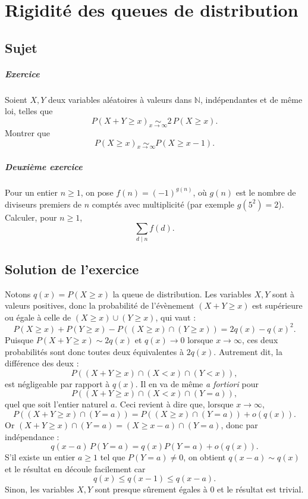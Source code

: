 \chapter{Rigidité des queues de distribution}

\section{Sujet}

\paragraph{Exercice}

Soient $X,Y$ deux variables aléatoires à valeurs dans $\mathbb N$, indépendantes et de même loi, telles que
$$
P(X+Y \geqslant x) \underset{x\to\infty}\sim 2\,P(X \geqslant x).
$$
Montrer que
$$
P(X \geqslant x) \underset{x\to\infty}\sim P(X \geqslant x-1).
$$

\paragraph{Deuxième exercice}
Pour un entier \( n \geqslant 1 \), on pose \( f(n) = (-1)^{g(n)} \), où \( g(n) \) est le nombre de diviseurs premiers de \( n \) comptés avec multiplicité (par exemple \( g(5^2) = 2 \)). Calculer, pour \( n \geqslant 1 \), 
\[ \sum_{d\mid n} f(d). \]

\section{Solution de l'exercice}

Notons $q(x) = P(X \geqslant x)$ la queue de distribution. Les variables $X,Y$ sont à valeurs positives, donc la probabilité de l'évènement $(X + Y \geqslant x)$ est supérieure ou égale à celle de $(X\geqslant x) \cup (Y \geqslant x)$, qui vaut :
\[
P(X\geqslant x) + P(Y \geqslant x) - P((X\geqslant x) \cap (Y \geqslant x)) = 2q(x) - q(x)^2.
\]
Puisque $P(X+Y \geqslant x) \sim 2q(x)$ et $q(x) \to 0$  lorsque $x \to \infty$, ces deux probabilités sont donc toutes deux équivalentes à $2q(x)$. Autrement dit, la différence des deux :
\[
P((X + Y \geqslant x) \cap (X < x) \cap (Y < x)),
\]
est négligeable par rapport à $q(x)$. Il en va de même \textit{a fortiori} pour
\[
P((X + Y \geqslant x) \cap (X < x) \cap (Y = a)),
\]
quel que soit l'entier naturel $a$. Ceci revient à dire que, lorsque $x \to \infty$,
\[
P((X+Y \geqslant x) \cap (Y = a)) = P((X \geqslant x) \cap (Y = a)) + o(q(x)).
\]
Or $(X+Y \geqslant x) \cap (Y=a) = (X \geqslant x - a) \cap (Y=a)$, donc par indépendance :
\[
q(x-a)\,P(Y = a) = q(x) P(Y = a) + o(q(x)).
\]
S'il existe un entier $a \geqslant 1$ tel que $P(Y = a) \neq 0$, on obtient $q(x - a) \sim q(x)$ et le résultat en découle facilement car
\[
q(x) \leqslant q(x-1) \leqslant q(x-a).
\]
Sinon, les variables $X,Y$ sont presque sûrement égales à $0$ et le résultat est trivial.\\


